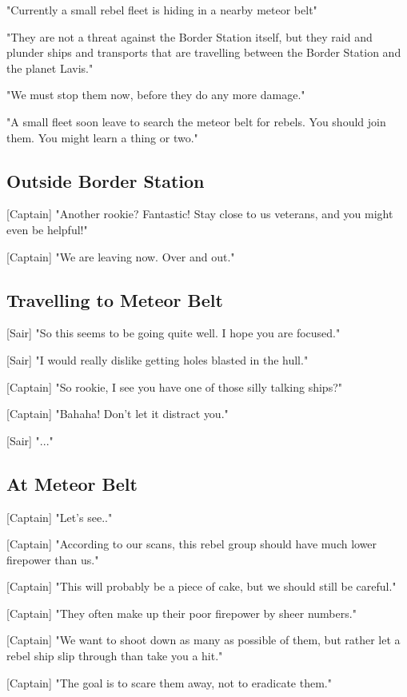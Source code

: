 \documentclass[a4paper,12pt]{article}
\begin{document}
"Currently a small rebel fleet is hiding in a nearby meteor belt"

"They are not a threat against the Border Station itself, but they raid and plunder ships
and transports that are travelling between the Border Station and the planet Lavis."

"We must stop them now, before they do any more damage." 

"A small fleet soon leave to search the meteor belt for rebels. You should join them.
You might learn a thing or two."

\subsection{Outside Border Station}

[Captain] "Another rookie? Fantastic! Stay close to us veterans, and
you might even be helpful!" 

[Captain] "We are leaving now. Over and out."

\subsection{Travelling to Meteor Belt}

[Sair] "So this seems to be going quite well. I hope you are focused."

[Sair] "I would really dislike getting holes blasted in the hull."

[Captain] "So rookie, I see you have one of those silly talking ships?" 

[Captain] "Bahaha! Don't let it distract you."

[Sair] "..."

\subsection{At Meteor Belt}

[Captain] "Let's see.." 

[Captain] "According to our scans, this rebel group should have much lower firepower than us."

[Captain] "This will probably be a piece of cake, but we should still be careful."

[Captain] "They often make up their poor firepower by sheer numbers."

[Captain] "We want to shoot down as many as possible of them, but rather let a rebel ship slip through than take
you a hit."

[Captain] "The goal is to scare them away, not to eradicate them."
\end{document}
